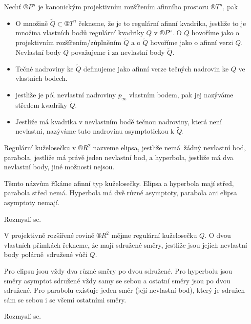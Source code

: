 \documentclass[12pt]{article}					%
\begin{document}
\begin{definice}
	Nechť $®P^n$ je kanonickým projektivním rozšířením afinního prostoru $®T^n$, pak
	
	\begin{itemize}
		\item O množině $\tilde{Q} \subset ®T^n$ řekneme, že je to regulární afinní kvadrika, jestliže to je množina vlastních bodů regulární kvadriky $Q$ v $®P^n$. O $Q$ hovoříme jako o projektivním rozšířením/zúplněním $\tilde{Q}$ a o $\tilde{Q}$ hovoříme jako o afinní verzi $Q$. Nevlastní body $Q$ považujeme i za nevlastní body $\tilde{Q}$.
		\item Tečné nadroviny ke $\tilde{Q}$ definujeme jako afinní verze tečných nadrovin ke $Q$ ve vlastních bodech.
		\item jestliže je pól nevlastní nadroviny $p_∞$ vlastním bodem, pak jej nazýváme středem kvadriky $\tilde{Q}$.
		\item Jestliže má kvadrika v nevlastním bodě tečnou nadroviny, která není nevlastní, nazýváme tuto nadrovinu asymptotickou k $\tilde{Q}$.
	\end{itemize}
\end{definice}

\begin{definice}
	Regulární kuželosečku v $®R^2$ nazveme elipsa, jestliže nemá žádný nevlastní bod, parabola, jestliže má právě jeden nevlastní bod, a hyperbola, jestliže má dva nevlastní body, jiné možnosti nejsou.

	Těmto názvům říkáme afinní typ kuželosečky. Elipsa a hyperbola mají střed, parabola střed nemá. Hyperbola má dvě různé asymptoty, parabola ani elipsa asymptoty nemají.

	\begin{dukazin}
		Rozmyslí se.
	\end{dukazin}
\end{definice}

\begin{definice}
	 V projektivně rozšířené rovině $®R^2$ mějme regulární kuželosečku $Q$. O dvou vlastních přímkách řekneme, že mají sdružené směry, jestliže jsou jejich nevlastní body polárně sdružené vůči $Q$.

	 Pro elipsu jsou vždy dva různé směry po dvou sdružené. Pro hyperbolu jsou směry asymptot sdružené vždy samy se sebou a ostatní směry jsou po dvou sdružené. Pro parabolu existuje jeden směr (její nevlastní bod), který je sdružen sám se sebou i se všemi ostatními směry.

	 \begin{dukazin}
	 	Rozmyslí se.
	 \end{dukazin}
\end{definice}
\end{document}
